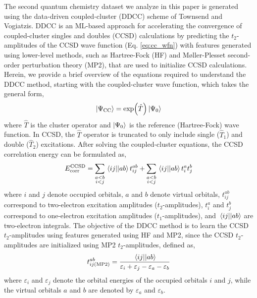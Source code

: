 \documentclass[journal=jacsat,manuscript=article]{achemso}
\begin{document}
The second quantum chemistry dataset we analyze in this paper is generated using the data-driven coupled-cluster (DDCC) scheme of Townsend and Vogiatzis.\cite{townsend_data-driven_2019,jones_chapter_2023}
DDCC is an ML-based approach for accelerating the convergence of coupled-cluster singles and doubles (CCSD) calculations by predicting the $t_{2}$-amplitudes of the CCSD wave function (Eq. \ref{eq:cc_wfn}) with features generated using lower-level methods, such as Hartree-Fock (HF) and M{\o}ller-Plesset second-order perturbation theory (MP2), that are used to initialize CCSD calculations.
Herein, we provide a brief overview of the equations required to understand the DDCC method, starting with the coupled-cluster wave function, which takes the general form,
\begin{equation}
	\ket{\Psi_{\text{CC}}} = \exp(\hat{T}) \ket{\Psi_{0}}
	\label{eq:cc_wfn}
\end{equation}
where $\hat{T}$ is the cluster operator and $\ket{\Psi_{0}}$ is the reference (Hartree-Fock) wave function.
In CCSD, the $\hat{T}$ operator is truncated to only include single ($\hat{T}_{1}$) and double ($\hat{T}_{2}$) excitations.
After solving the coupled-cluster equations, the CCSD correlation energy can be formulated as,
\begin{equation}
	E^{\text{CCSD}}_{\text{corr}} = \sum_{\substack{a<b \\ i<j}} \mel{ij}{}{ab} t^{ab}_{ij} + \sum_{\substack{a<b \\ i<j}} \mel{ij}{}{ab} t^{a}_{i} t^{b}_{j}
	\label{eq:cc_corr}
\end{equation}
where $i$ and $j$ denote occupied orbitals, $a$ and $b$ denote virtual orbitals, $t^{ab}_{ij}$ correspond to two-electron excitation amplitudes ($t_{2}$-amplitudes), $t^{a}_{i}$ and $t^{b}_{j}$ correspond to one-electron excitation amplitudes ($t_{1}$-amplitudes), and $\mel{ij}{}{ab}$ are two-electron integrals.
The objective of the DDCC method is to learn the CCSD $t_{2}$-amplitudes using features generated using HF and MP2, since the CCSD $t_{2}$-amplitudes are initialized using MP2 $t_{2}$-amplitudes, defined as,
\begin{equation}
	t^{ab}_{ij(\text{MP2})} = \frac{\mel{ij}{}{ab}}{\varepsilon_{i}+\varepsilon_{j}-\varepsilon_{a}-\varepsilon_{b}}
	\label{eq:MP2_t2}
\end{equation}
where $\varepsilon_{i}$ and $\varepsilon_{j}$ denote the orbital energies of the occupied orbitals $i$ and $j$, while the virtual orbitals $a$ and $b$ are denoted by $\varepsilon_{a}$ and $\varepsilon_{b}$.
\end{document}

